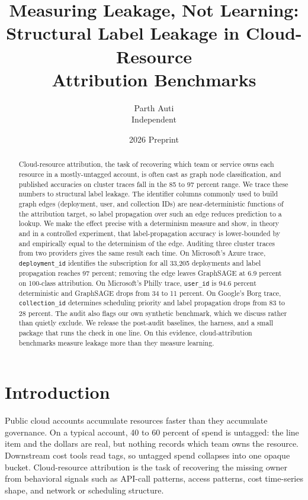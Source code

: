 \documentclass[11pt]{article}
\title{\textbf{Measuring Leakage, Not Learning:\\
Structural Label Leakage in Cloud-Resource\\ Attribution Benchmarks}}
\author{Parth Auti\\
\small Independent \quad\textbar\quad \href{https://github.com/pauti04/CostDNA}{\code{github.com/pauti04/CostDNA}}}
\date{2026 \quad\textbar\quad Preprint}
\newcommand{\code}[1]{\texttt{#1}}
\begin{document}
\maketitle

\begin{abstract}
\noindent
Cloud-resource attribution, the task of recovering which team or service owns
each resource in a mostly-untagged account, is often cast as graph node
classification, and published accuracies on cluster traces fall in the 85 to
97 percent range. We trace these numbers to structural label leakage. The
identifier columns commonly used to build graph edges (deployment, user, and
collection IDs) are near-deterministic functions of the attribution target, so
label propagation over such an edge reduces prediction to a lookup. We make the
effect precise with a determinism measure and show, in theory and in a
controlled experiment, that label-propagation accuracy is lower-bounded by and
empirically equal to the determinism of the edge. Auditing three cluster traces
from two providers gives the same result each time. On Microsoft's Azure trace,
\code{deployment\_id} identifies the subscription for all 33{,}205 deployments
and label propagation reaches 97 percent; removing the edge leaves GraphSAGE at
6.9 percent on 100-class attribution. On Microsoft's Philly trace,
\code{user\_id} is 94.6 percent deterministic and GraphSAGE drops from 34 to 11
percent. On Google's Borg trace, \code{collection\_id} determines scheduling
priority and label propagation drops from 83 to 28 percent. The audit also
flags our own synthetic benchmark, which we discuss rather than quietly exclude.
We release the post-audit baselines, the harness, and a small package that runs
the check in one line. On this evidence, cloud-attribution benchmarks measure
leakage more than they measure learning.
\end{abstract}

\section{Introduction}

Public cloud accounts accumulate resources faster than they accumulate
governance. On a typical account, 40 to 60 percent of spend is untagged: the
line item and the dollars are real, but nothing records which team owns the
resource. Downstream cost tools read tags, so untagged spend collapses into one
opaque bucket. Cloud-resource attribution is the task of recovering the missing
owner from behavioral signals such as API-call patterns, access patterns, cost
time-series shape, and network or scheduling structure.
\end{document}
